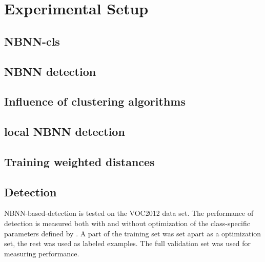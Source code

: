 \chapter{Experimental Setup} %
\label{sec:experimental_setup}

\section{NBNN-cls} %
\label{sub:nbnn-cls}


\section{NBNN detection} %
\label{sub:nbnn_detection}


\section{Influence of clustering algorithms} %
\label{sub:influence_of_clustering_algorithms}


\section{local NBNN detection} %
\label{sub:local_nbnn_detection}


\section{Training weighted distances} %
\label{sub:training_weighted_distances}

\section{Detection} %
\label{sub:detection}
NBNN-based-detection is tested on the VOC2012  data set. The performance of detection is measured both with and without optimization of the class-\-specific pa\-ra\-me\-ters defined by \cite{behmo2010towards}. A part of the training set was set apart as a optimization set, the rest was used as labeled examples. The full validation set was used for measuring performance.

